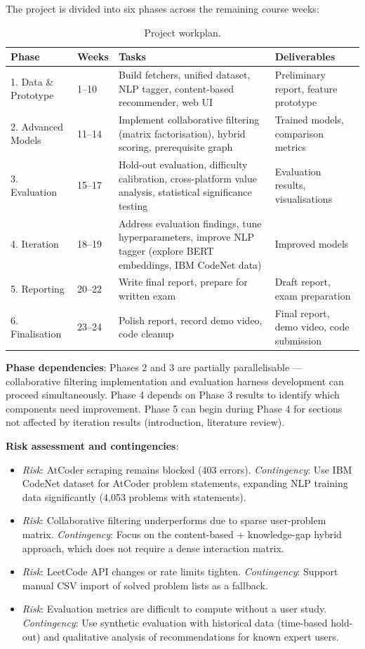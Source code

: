 \documentclass[12pt,a4paper]{article}
\begin{document}
The project is divided into six phases across the remaining course weeks:

\begin{table}[htbp]
\centering
\small
\begin{tabularx}{\textwidth}{l l X X}
\toprule
\textbf{Phase} & \textbf{Weeks} & \textbf{Tasks} & \textbf{Deliverables} \\
\midrule
1. Data \& Prototype & 1--10 & Build fetchers, unified dataset, NLP tagger, content-based recommender, web UI & Preliminary report, feature prototype \\
2. Advanced Models & 11--14 & Implement collaborative filtering (matrix factorisation), hybrid scoring, prerequisite graph & Trained models, comparison metrics \\
3. Evaluation & 15--17 & Hold-out evaluation, difficulty calibration, cross-platform value analysis, statistical significance testing & Evaluation results, visualisations \\
4. Iteration & 18--19 & Address evaluation findings, tune hyperparameters, improve NLP tagger (explore BERT embeddings, IBM CodeNet data) & Improved models \\
5. Reporting & 20--22 & Write final report, prepare for written exam & Draft report, exam preparation \\
6. Finalisation & 23--24 & Polish report, record demo video, code cleanup & Final report, demo video, code submission \\
\bottomrule
\end{tabularx}
\caption{Project workplan.}
\label{tab:workplan}
\end{table}

\textbf{Phase dependencies}: Phases 2 and 3 are partially parallelisable --- collaborative filtering implementation and evaluation harness development can proceed simultaneously. Phase 4 depends on Phase 3 results to identify which components need improvement. Phase 5 can begin during Phase 4 for sections not affected by iteration results (introduction, literature review).

\textbf{Risk assessment and contingencies}:

\begin{itemize}
    \item \emph{Risk}: AtCoder scraping remains blocked (403 errors). \emph{Contingency}: Use IBM CodeNet dataset for AtCoder problem statements, expanding NLP training data significantly (4,053 problems with statements).
    \item \emph{Risk}: Collaborative filtering underperforms due to sparse user-problem matrix. \emph{Contingency}: Focus on the content-based + knowledge-gap hybrid approach, which does not require a dense interaction matrix.
    \item \emph{Risk}: LeetCode API changes or rate limits tighten. \emph{Contingency}: Support manual CSV import of solved problem lists as a fallback.
    \item \emph{Risk}: Evaluation metrics are difficult to compute without a user study. \emph{Contingency}: Use synthetic evaluation with historical data (time-based hold-out) and qualitative analysis of recommendations for known expert users.
\end{itemize}
\end{document}
